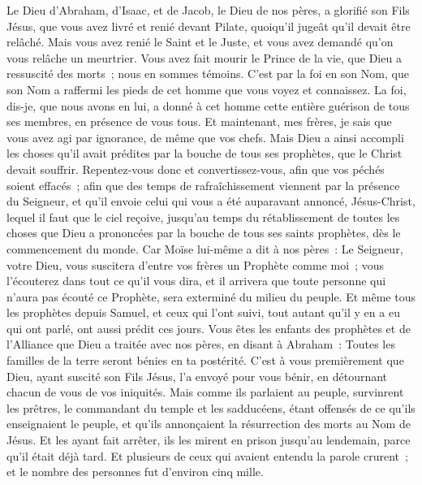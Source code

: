 \begin{multicols}{2}
Le Dieu d'Abraham, d'Isaac, et de Jacob, le Dieu de nos pères, a glorifié son Fils Jésus, que vous avez livré et renié devant Pilate, quoiqu'il jugeât qu'il devait être relâché.
Mais vous avez renié le Saint et le Juste, et vous avez demandé qu'on vous relâche un meurtrier.
Vous avez fait mourir le Prince de la vie, que Dieu a ressuscité des morts~; nous en sommes témoins.
C'est par la foi en son Nom, que son Nom a raffermi les pieds de cet homme que vous voyez et connaissez. La foi, dis-je, que nous avons en lui, a donné à cet homme cette entière guérison de tous ses membres, en présence de vous tous.
Et maintenant, mes frères, je sais que vous avez agi par ignorance, de même que vos chefs.
Mais Dieu a ainsi accompli les choses qu'il avait prédites par la bouche de tous ses prophètes, que le Christ devait souffrir.
Repentez-vous donc et convertissez-vous, afin que vos péchés soient effacés~;
afin que des temps de rafraîchissement viennent par la présence du Seigneur, et qu'il envoie celui qui vous a été auparavant annoncé, Jésus-Christ,
lequel il faut que le ciel reçoive, jusqu'au temps du rétablissement de toutes les choses que Dieu a prononcées par la bouche de tous ses saints prophètes, dès le commencement du monde.
Car Moïse lui-même a dit à nos pères~: Le Seigneur, votre Dieu, vous suscitera d'entre vos frères un Prophète comme moi~; vous l'écouterez dans tout ce qu'il vous dira,
et il arrivera que toute personne qui n'aura pas écouté ce Prophète, sera exterminé du milieu du peuple.
Et même tous les prophètes depuis Samuel, et ceux qui l'ont suivi, tout autant qu'il y en a eu qui ont parlé, ont aussi prédit ces jours.
Vous êtes les enfants des prophètes et de l'Alliance que Dieu a traitée avec nos pères, en disant à Abraham~: Toutes les familles de la terre seront bénies en ta postérité.
C'est à vous premièrement que Dieu, ayant suscité son Fils Jésus, l'a envoyé pour vous bénir, en détournant chacun de vous de vos iniquités.
\VerseOne{}Mais comme ils parlaient au peuple, survinrent les prêtres, le commandant du temple et les sadducéens,
étant offensés de ce qu'ils enseignaient le peuple, et qu'ils annonçaient la résurrection des morts au Nom de Jésus.
Et les ayant fait arrêter, ils les mirent en prison jusqu'au lendemain, parce qu'il était déjà tard.
Et plusieurs de ceux qui avaient entendu la parole crurent~; et le nombre des personnes fut d'environ cinq mille.

\end{multicols}
